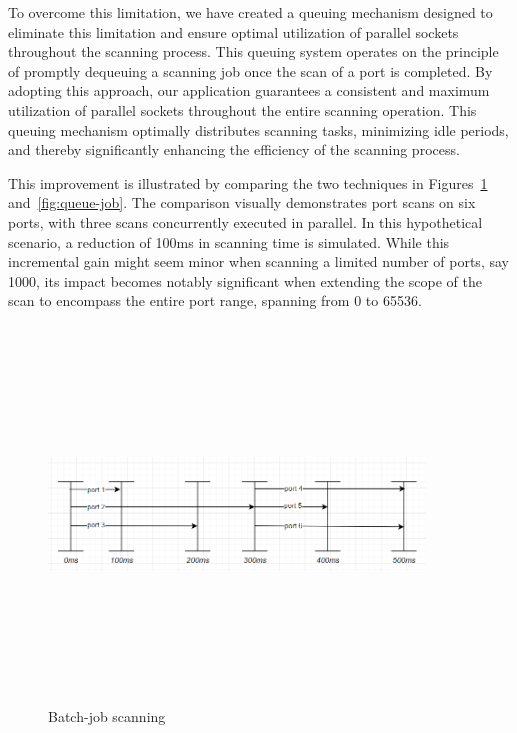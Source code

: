 To overcome this limitation, we have created a queuing mechanism designed to eliminate this limitation and ensure optimal utilization of parallel sockets throughout the scanning process. This queuing system operates on the principle of promptly dequeuing a scanning job once the scan of a port is completed. By adopting this approach, our application guarantees a consistent and maximum utilization of parallel sockets throughout the entire scanning operation. This queuing mechanism optimally distributes scanning tasks, minimizing idle periods, and thereby significantly enhancing the efficiency of the scanning process.

This improvement is illustrated by comparing the two techniques in Figures~\ref{fig:batch-job} and~\ref{fig:queue-job}. The comparison visually demonstrates port scans on six ports, with three scans concurrently executed in parallel. In this hypothetical scenario, a reduction of 100ms in scanning time is simulated. While this incremental gain might seem minor when scanning a limited number of ports, say 1000, its impact becomes notably significant when extending the scope of the scan to encompass the entire port range, spanning from 0 to 65536.

\begin{figure}[htbp]
    \centering
\includegraphics[width=10cm, height=10cm, keepaspectratio]{port_scanning_techniques/img/batch-job.png}
    \caption{Batch-job scanning}
    \label{fig:batch-job}
\end{figure}


